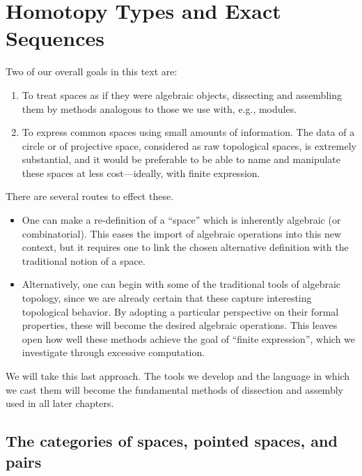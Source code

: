 
\chapter{Homotopy Types and Exact Sequences}

Two of our overall goals in this text are:
\begin{enumerate}
    \item
    To treat spaces as if they were algebraic objects, dissecting and assembling them by methods analogous to those we use with, e.g., modules.
    \item
    To express common spaces using small amounts of information.
    The data of a circle or of projective space, considered as raw topological spaces, is extremely substantial, and it would be preferable to be able to name and manipulate these spaces at less cost---ideally, with finite expression.
\end{enumerate}

\noindent
There are several routes to effect these.

\begin{itemize}
    \item
    One can make a re-definition of a ``space'' which is inherently algebraic (or combinatorial).
    This eases the import of algebraic operations into this new context, but it requires one to link the chosen alternative definition with the traditional notion of a space.%
    \item
    Alternatively, one can begin with some of the traditional tools of algebraic topology, since we are already certain that these capture interesting topological behavior.
    By adopting a particular perspective on their formal properties, these will become the desired algebraic operations.
    This leaves open how well these methods achieve the goal of ``finite expression'', which we investigate through excessive computation.
\end{itemize}

\noindent
We will take this last approach.
The tools we develop and the language in which we cast them will become the fundamental methods of dissection and assembly used in all later chapters.




\section{The categories of spaces, pointed spaces, and pairs}\label{CategoriesSection}

